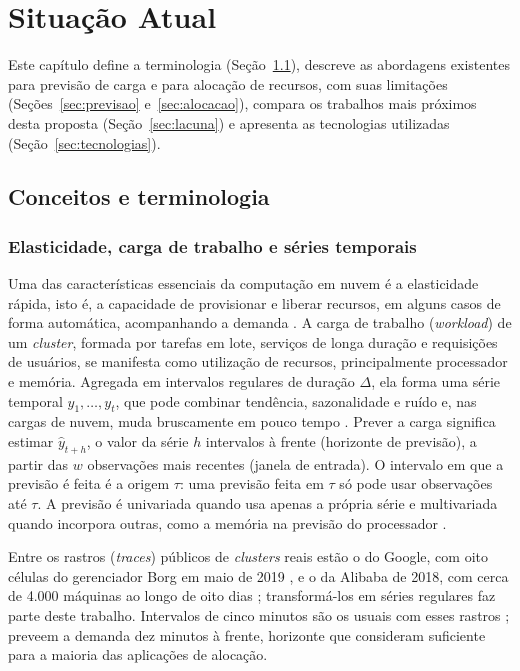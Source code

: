 \chapter{Situação Atual}
\label{cap:situacao-atual}

Este capítulo define a terminologia (Seção~\ref{sec:conceitos}), descreve as abordagens existentes para previsão de carga e para alocação de recursos, com suas limitações (Seções~\ref{sec:previsao} e~\ref{sec:alocacao}), compara os trabalhos mais próximos desta proposta (Seção~\ref{sec:lacuna}) e apresenta as tecnologias utilizadas (Seção~\ref{sec:tecnologias}).

\section{Conceitos e terminologia}
\label{sec:conceitos}

\subsection{Elasticidade, carga de trabalho e séries temporais}
\label{subsec:carga}

Uma das características essenciais da computação em nuvem é a elasticidade rápida, isto é, a capacidade de provisionar e liberar recursos, em alguns casos de forma automática, acompanhando a demanda \cite{mell2011nist}. A carga de trabalho (\textit{workload}) de um \textit{cluster}, formada por tarefas em lote, serviços de longa duração e requisições de usuários, se manifesta como utilização de recursos, principalmente processador e memória. Agregada em intervalos regulares de duração $\Delta$, ela forma uma série temporal $y_1, \dots, y_t$, que pode combinar tendência, sazonalidade e ruído \cite{hyndman2018forecasting} e, nas cargas de nuvem, muda bruscamente em pouco tempo \cite{xu2022esdnn}. Prever a carga significa estimar $\hat{y}_{t+h}$, o valor da série $h$ intervalos à frente (horizonte de previsão), a partir das $w$ observações mais recentes (janela de entrada). O intervalo em que a previsão é feita é a origem $\tau$: uma previsão feita em $\tau$ só pode usar observações até $\tau$. A previsão é univariada quando usa apenas a própria série e multivariada quando incorpora outras, como a memória na previsão do processador \cite{xu2022esdnn}.

Entre os rastros (\textit{traces}) públicos de \textit{clusters} reais estão o do Google, com oito células do gerenciador Borg em maio de 2019 \cite{wilkes2020google}, e o da Alibaba de 2018, com cerca de 4.000 máquinas ao longo de oito dias \cite{alibaba2018trace}; transformá-los em séries regulares faz parte deste trabalho. Intervalos de cinco minutos são os usuais com esses rastros \cite{rossi2023forecasting, agullo2025enhancing};  preveem a demanda dez minutos à frente, horizonte que consideram suficiente para a maioria das aplicações de alocação.


